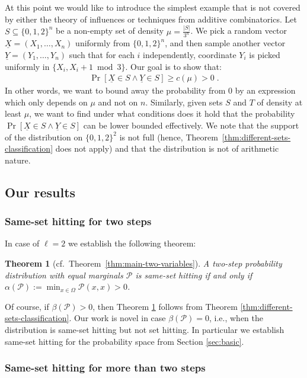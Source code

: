 \documentclass{daj}
\newcommand{\1}{\mathbbm{1}}
\theoremstyle{plain}
\newtheorem{theorem}{Theorem}[section]
\theoremstyle{definition}
\newcommand{\cP}{\mathcal{P}}
\begin{document}
At this point we would like to introduce the simplest example that is not covered by either the theory of influences or techniques from additive combinatorics. 
Let $S \subseteq \{0,1,2\}^n$ be a non-empty set of density
$\mu = \frac{|S|}{3^n}$.  We pick a random vector
$\underline{X} = (X_1, \ldots, X_n)$ uniformly from $\{0,1,2\}^n$, and then
sample another vector $\underline{Y} = (Y_1,\ldots,Y_n)$ such that for each
$i$ independently, coordinate $Y_i$ is picked uniformly in
$\{X_i, X_i+1 \bmod{3}\}$.  Our goal is to show that:
\begin{align*}
\Pr[\underline{X} \in S \land \underline{Y} \in S] \ge c(\mu) > 0 \; .
\end{align*}
In other words, we want to bound away the probability from $0$
by an expression which only depends on $\mu$ and not on $n$.
Similarly, given sets $S$ and $T$ of density at least $\mu$,
we want to find under what conditions does it hold that the
probability $\Pr[\underline{X} \in S \land \underline{Y} \in S]$ can be lower
bounded effectively. We note that the support of the distribution on
$\{0,1,2\}^2$ is not full
(hence, Theorem~\ref{thm:different-sets-classification} does not apply)
and that the distribution is not of arithmetic nature. 
\subsection{Our results}


\subsubsection{Same-set hitting for two steps}

In case of $\ell = 2$ we establish the following theorem:
\begin{theorem}[cf.~Theorem~\ref{thm:main-two-variables}]
\label{thm:two-steps-classification}
A two-step probability distribution with equal marginals $\mathcal{P}$
is same-set hitting if and only if
$\alpha(\mathcal{P}) := \min_{x \in \Omega} \cP(x, x)
> 0$.
\end{theorem}

Of course, if $\beta(\cP) > 0$, then Theorem \ref{thm:two-steps-classification}
follows from Theorem \ref{thm:different-sets-classification}. 
Our work is novel in case $\beta(\mathcal{P}) = 0$,
i.e., when the distribution is same-set hitting but not set hitting.
In particular we establish same-set hitting
for the probability space from Section \ref{sec:basic}.

\subsubsection{Same-set hitting for more than two steps}
\end{document}
